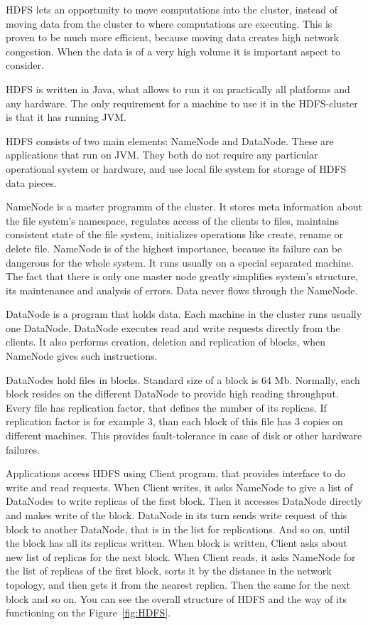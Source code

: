 HDFS lets an opportunity to move computations into the cluster, instead of moving data from the cluster to where computations are executing.
This is proven to be much more efficient, because moving data creates high network congestion.
When the data is of a very high volume it is important aspect to consider.

HDFS is written in Java, what allows to run it on practically all platforms and any hardware.
The only requirement for a machine to use it in the HDFS-cluster is that it has running JVM.


HDFS consists of two main elements: NameNode and DataNode.
These are applications that run on JVM.
They both do not require any particular operational system or hardware, and use local file system for storage of HDFS data pieces.

NameNode is a master programm of the cluster.
It stores meta information about the file system's namespace, regulates access of the clients to files, maintains consistent state of the file system, initializes operations like create, rename or delete file.
NameNode is of the highest importance, because its failure can be dangerous for the whole system.
It runs usually on a special separated machine.
The fact that there is only one master node greatly simplifies system's structure, its maintenance and analysis of errors.
Data never flows through the NameNode.

DataNode is a program that holds data.
Each machine in the cluster runs usually one DataNode.
DataNode executes read and write requests directly from the clients.
It also performs creation, deletion and replication of blocks, when NameNode gives such instructions.

DataNodes hold files in blocks.
Standard size of a block is 64 Mb.
Normally, each block resides on the different DataNode to provide high reading throughput.
Every file has replication factor, that defines the number of its replicas.
If replication factor is for example 3, than each block of this file has 3 copies on different machines.
This provides fault-tolerance in case of disk or other hardware failures.

Applications access HDFS using Client program, that provides interface to do write and read requests.
When Client writes, it asks NameNode to give a list of DataNodes to write replicas of the first block.
Then it accesses DataNode directly and makes write of the block.
DataNode in its turn sends write request of this block to another DataNode, that is in the list for replications.
And so on, until the block has all its replicas written.
When block is written, Client asks about new list of replicas for the next block.
When Client reads, it asks NameNode for the list of replicas of the first block, sorts it by the distance in the network topology, and then gets it from the nearest replica.
Then the same for the next block and so on.
You can see the overall structure of HDFS and the way of its functioning on the Figure~\ref{fig:HDFS}.

